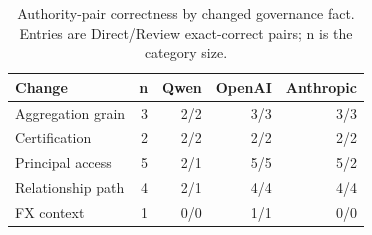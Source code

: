 \begin{table}[t]
\centering
\caption{Authority-pair correctness by changed governance fact. Entries are Direct/Review exact-correct pairs; n is the category size.}
\label{tab:changes}
{\small
\begin{tabular}{lrrrr}
\toprule
Change & n & Qwen & OpenAI & Anthropic \\
\midrule
Aggregation grain & 3 & 2/2 & 3/3 & 3/3 \\
Certification & 2 & 2/2 & 2/2 & 2/2 \\
Principal access & 5 & 2/1 & 5/5 & 5/2 \\
Relationship path & 4 & 2/1 & 4/4 & 4/4 \\
FX context & 1 & 0/0 & 1/1 & 0/0 \\
\bottomrule
\end{tabular}
}
\end{table}
